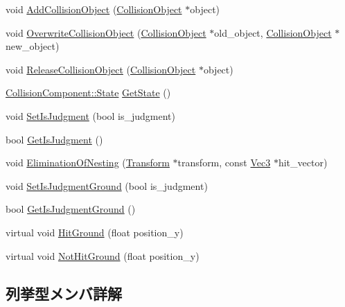 \begin{DoxyCompactItemize}
\item 
void \mbox{\hyperlink{class_collision_component_a854099e1777f0ddcb309c00300299607}{Add\+Collision\+Object}} (\mbox{\hyperlink{class_collision_object}{Collision\+Object}} $\ast$object)
\item 
void \mbox{\hyperlink{class_collision_component_a8ce25aa3edd0ca27b8e7b4c15e73400d}{Overwrite\+Collision\+Object}} (\mbox{\hyperlink{class_collision_object}{Collision\+Object}} $\ast$old\+\_\+object, \mbox{\hyperlink{class_collision_object}{Collision\+Object}} $\ast$new\+\_\+object)
\item 
void \mbox{\hyperlink{class_collision_component_a62686d64bc293780425a3d6a18edf26b}{Release\+Collision\+Object}} (\mbox{\hyperlink{class_collision_object}{Collision\+Object}} $\ast$object)
\item 
\mbox{\hyperlink{class_collision_component_a91ba750c14ccd0f4857f0302f06084c6}{Collision\+Component\+::\+State}} \mbox{\hyperlink{class_collision_component_a9d614f27219068bb9d17574e0f8a8767}{Get\+State}} ()
\item 
void \mbox{\hyperlink{class_collision_component_acbda86e666f83d89bfb4c393ebfff0d0}{Set\+Is\+Judgment}} (bool is\+\_\+judgment)
\item 
bool \mbox{\hyperlink{class_collision_component_add2c3ab4392b62d11d6a10c641244d6c}{Get\+Is\+Judgment}} ()
\item 
void \mbox{\hyperlink{class_collision_component_a9ec98b8eb17abe18f2f8487393af0954}{Elimination\+Of\+Nesting}} (\mbox{\hyperlink{class_transform}{Transform}} $\ast$transform, const \mbox{\hyperlink{_vector3_d_8h_ab16f59e4393f29a01ec8b9bbbabbe65d}{Vec3}} $\ast$hit\+\_\+vector)
\item 
void \mbox{\hyperlink{class_collision_component_a84cf5e2c0e4804307c5cf1b78413deef}{Set\+Is\+Judgment\+Ground}} (bool is\+\_\+judgment)
\item 
bool \mbox{\hyperlink{class_collision_component_adb0dcdb246d9e8efd03d4c433a673bb9}{Get\+Is\+Judgment\+Ground}} ()
\item 
virtual void \mbox{\hyperlink{class_collision_component_a7538567006556bc03524df2655e83956}{Hit\+Ground}} (float position\+\_\+y)
\item 
virtual void \mbox{\hyperlink{class_collision_component_ac918c96ab6efff2bd79497932b2c4852}{Not\+Hit\+Ground}} (float position\+\_\+y)
\end{DoxyCompactItemize}


\subsection{列挙型メンバ詳解}
\mbox{\label{class_collision_component_a91ba750c14ccd0f4857f0302f06084c6}} 
